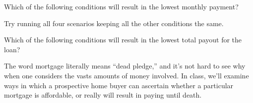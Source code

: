 \documentclass{ximera}
\begin{document}
\begin{question}
Which of the following conditions will result in the lowest monthly payment?

\begin{multipleChoice}
\end{multipleChoice}
\begin{hint}
Try running all four scenarios keeping all the other conditions the same.
\end{hint}

\end{question}

\begin{question}
Which of the following conditions will result in the lowest total payout for the loan?

\begin{multipleChoice}
\end{multipleChoice}

\end{question}

The word mortgage literally means ``dead pledge,'' and it's not hard to see why when one considers the vasts amounts of money involved. In class, we'll examine ways in which a prospective home buyer can ascertain whether a particular mortgage is affordable, or really will result in paying until death.
\end{document}

